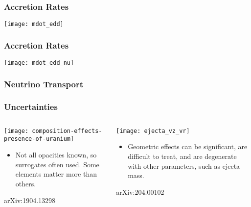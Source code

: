 \documentclass[]{beamer}
\newcommand{\backupbegin}{
   \newcounter{finalframe}
   \setcounter{finalframe}{\value{framenumber}}
}
\begin{document}
\backupbegin

\begin{frame}
  \frametitle{Accretion Rates}
  \begin{center}
    \texttt{[image: mdot\_edd]}
  \end{center}
\end{frame}

\begin{frame}
  \frametitle{Accretion Rates}
  \begin{center}
    \texttt{[image: mdot\_edd\_nu]}
  \end{center}
\end{frame}


\begin{frame}
  \frametitle{Neutrino Transport}
  \begin{center}
  \end{center}
\end{frame}

\begin{frame}
  \frametitle{Uncertainties}
  \begin{columns}
    \begin{column}{6cm}
      \begin{center}
        \texttt{[image: composition-effects-presence-of-uranium]}
      \end{center}
      \begin{itemize}
      \item Not all opacities known, so surrogates often used. Some
        elements matter more than others.
      \end{itemize}
      {\footnotesize arXiv:1904.13298}
    \end{column}
    \begin{column}{6cm}
      \begin{center}
        \texttt{[image: ejecta\_vz\_vr]}
      \end{center}
      \begin{itemize}
      \item Geometric effects can be significant, are difficult to
        treat, and are degenerate with other parameters, such as
        ejecta mass.
      \end{itemize}
      {\footnotesize arXiv:204.00102}
    \end{column}
  \end{columns}
\end{frame}
\end{document}
